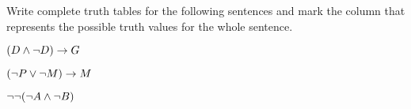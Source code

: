 \begin{practiceproblems}
\begin{earg}
	\vspace{1em}
	
\end{earg}

\problempart
Write complete truth tables for the following sentences and mark the column that represents the possible truth values for the whole sentence.

\begin{earg}
	
	\item	$(D \mathbin{\wedge} \neg D) \rightarrow G $
	
	
	\vspace{1em}
	
	
	\item	$(\neg P \vee \neg M) \rightarrow M $
	
	\vspace{1em}
	
	
	
	\item	$\neg \neg (\neg A \mathbin{\wedge} \neg B)  $
	

\end{earg}
\end{practiceproblems}
